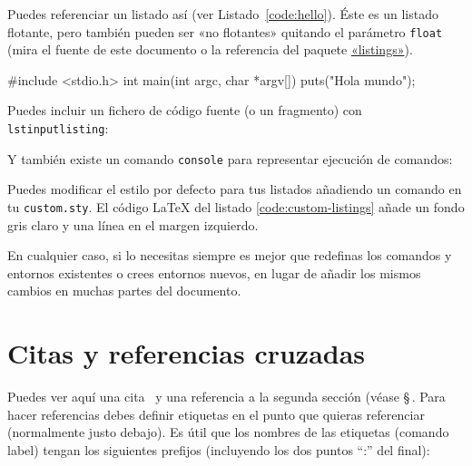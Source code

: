 Puedes referenciar un listado así (ver Listado~\ref{code:hello}). Éste es un
listado flotante, pero también pueden ser «no flotantes» quitando el parámetro
\texttt{float} (mira el fuente de este documento o la referencia del paquete
\href{http://www.ctan.org/get/macros/latex/contrib/listings/listings.pdf}{«listings»}).

\begin{listing}[
  float=ht,
  language = C,
  caption  = {«Hola mundo» en C},
  label    = code:hello]
#include <stdio.h>
int main(int argc, char *argv[]) {
    puts("Hola mundo\n");
}
\end{listing}

\noindent
Puedes incluir un fichero de código fuente (o un fragmento) con \texttt{lstinputlisting}:



\noindent
Y también existe un comando \texttt{console} para representar ejecución de
comandos:


Puedes modificar el estilo por defecto para tus listados añadiendo un comando
 en tu \texttt{custom.sty}. El código \LaTeX{} del listado
\ref{code:custom-listings} añade un fondo gris claro y una línea en el margen
izquierdo.

\begin{listing}[
  float=h!,
  caption  = {Personalizando los listados de código},
  label    = code:custom-listings]
\end{listing}

En cualquier caso, si lo necesitas siempre es mejor que redefinas los comandos y entornos
existentes o crees entornos nuevos, en lugar de añadir los mismos cambios en
muchas partes del documento.


\section{Citas y referencias cruzadas}

Puedes ver aquí una cita~\cite{design_patterns} y una referencia a la segunda sección
(véase \S\,. Para hacer referencias debes definir etiquetas en el punto
que quieras referenciar (normalmente justo debajo). Es útil que los nombres de las
etiquetas (comando label) tengan los siguientes prefijos (incluyendo los dos puntos ``:''
del final):

